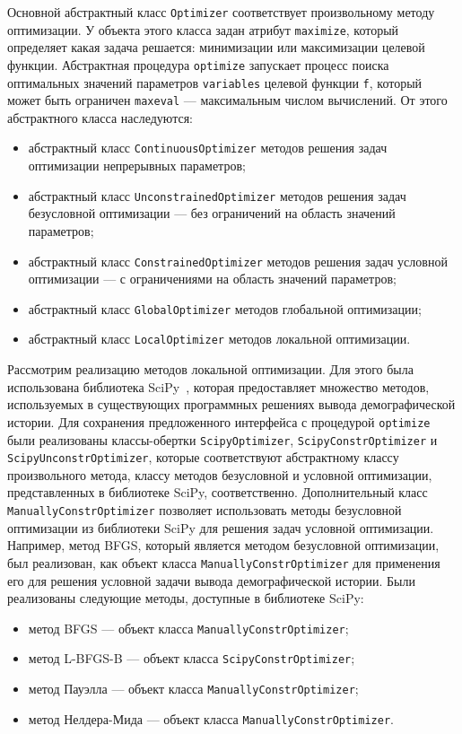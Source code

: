 Основной абстрактный класс \texttt{Optimizer} соответствует произвольному методу оптимизации.
У объекта этого класса задан атрибут \texttt{maximize}, который определяет какая задача решается: минимизации или максимизации целевой функции.
Абстрактная процедура \texttt{optimize} запускает процесс поиска оптимальных значений параметров \texttt{variables} целевой функции \texttt{f}, который может быть ограничен \texttt{maxeval} --- максимальным числом вычислений.
От этого абстрактного класса наследуются:
\begin{itemize}
    \item абстрактный класс \texttt{ContinuousOptimizer} методов решения задач оптимизации непрерывных параметров;
    \item абстрактный класс \texttt{UnconstrainedOptimizer} методов решения задач безусловной оптимизации --- без ограничений на область значений параметров;
    \item абстрактный класс \texttt{ConstrainedOptimizer} методов решения задач условной оптимизации --- с ограничениями на область значений параметров;
    \item абстрактный класс \texttt{GlobalOptimizer} методов глобальной оптимизации;
    \item абстрактный класс \texttt{LocalOptimizer} методов локальной оптимизации.
\end{itemize}

Рассмотрим реализацию методов локальной оптимизации.
Для этого была использована библиотека SciPy~\cite{virtanen2020scipy}, которая предоставляет множество методов, используемых в существующих программных решениях вывода демографической истории.
Для сохранения предложенного интерфейса с процедурой \texttt{optimize} были реализованы классы-обертки \texttt{ScipyOptimizer}, \texttt{ScipyConstrOptimizer} и \texttt{ScipyUnconstrOptimizer}, которые соответствуют абстрактному классу произвольного метода, классу методов безусловной и условной оптимизации, представленных в библиотеке SciPy, соответственно.
Дополнительный класс \texttt{ManuallyConstrOptimizer} позволяет использовать методы безусловной оптимизации из библиотеки SciPy для решения задач условной оптимизации.
Например, метод BFGS, который является методом безусловной оптимизации,  был реализован, как объект класса \texttt{ManuallyConstrOptimizer} для применения его для решения условной задачи вывода демографической истории.
Были реализованы следующие методы, доступные в библиотеке SciPy:
\begin{itemize}
    \item метод BFGS --- объект класса \texttt{ManuallyConstrOptimizer};
    \item метод L-BFGS-B --- объект класса \texttt{ScipyConstrOptimizer};
    \item метод Пауэлла --- объект класса \texttt{ManuallyConstrOptimizer};
    \item метод Нелдера-Мида --- объект класса \texttt{ManuallyConstrOptimizer}.
\end{itemize}

